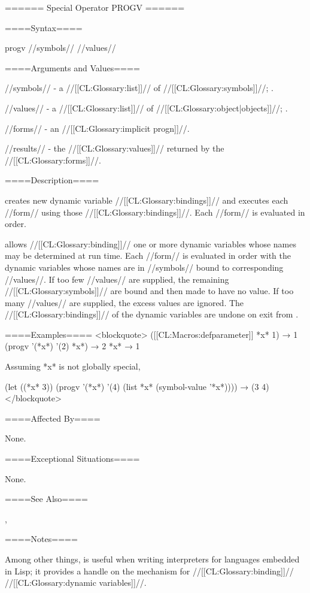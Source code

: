 ====== Special Operator PROGV ======

====Syntax====

\DefspecWithValues progv {//symbols// //values// } {}

====Arguments and Values====

//symbols// - a //[[CL:Glossary:list]]// of //[[CL:Glossary:symbols]]//; \eval.

//values// - a //[[CL:Glossary:list]]// of //[[CL:Glossary:object|objects]]//; \eval.

//forms// - an //[[CL:Glossary:implicit progn]]//.

//results// - the //[[CL:Glossary:values]]// returned by the //[[CL:Glossary:forms]]//.

====Description====

 creates new dynamic variable //[[CL:Glossary:bindings]]// and executes each //form// using those //[[CL:Glossary:bindings]]//. Each //form// is evaluated in order.

 allows //[[CL:Glossary:binding]]// one or more dynamic variables whose names may be determined at run time. Each //form// is evaluated in order with the dynamic variables whose names are in //symbols// bound to corresponding //values//. If too few //values// are supplied, the remaining //[[CL:Glossary:symbols]]// are bound and then made to have no value. If too many //values// are supplied, the excess values are ignored. The //[[CL:Glossary:bindings]]// of the dynamic variables are undone on exit from .

====Examples==== <blockquote> ([[CL:Macros:defparameter]] *x* 1) → 1 (progv '(*x*) '(2) *x*) → 2 *x* → 1

Assuming *x* is not globally special,

(let ((*x* 3)) (progv '(*x*) '(4) (list *x* (symbol-value '*x*)))) → (3 4) </blockquote>

====Affected By====

None.

====Exceptional Situations====

None.

====See Also====

, {\secref\Evaluation}

====Notes====

Among other things,  is useful when writing interpreters for languages embedded in Lisp; it provides a handle on the mechanism for //[[CL:Glossary:binding]]// //[[CL:Glossary:dynamic variables]]//.

